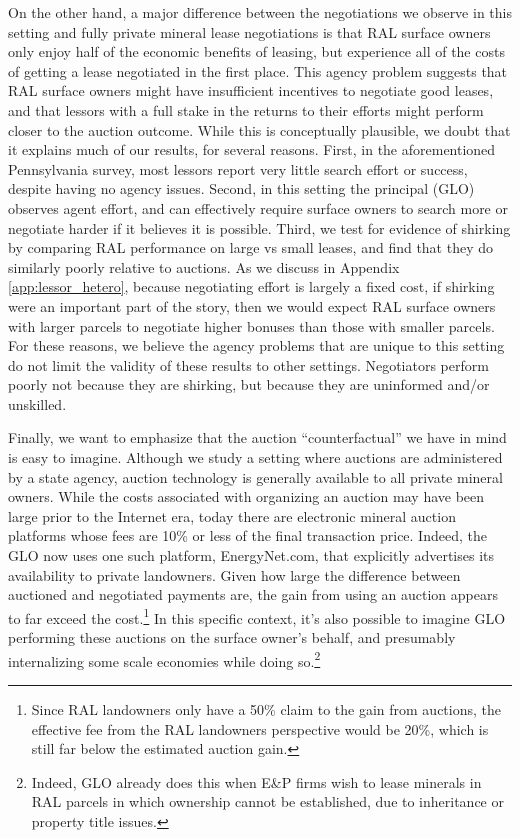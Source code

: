 \documentclass[12pt]{article}
\begin{document}
On the other hand, a major difference between the negotiations we observe in this setting and fully private mineral lease negotiations is that RAL surface owners only enjoy half of the economic benefits of leasing, but experience all of the costs of getting a lease negotiated in the first place. This agency problem suggests that RAL surface owners might have insufficient incentives to negotiate good leases, and that lessors with a full stake in the returns to their efforts might perform closer to the auction outcome. While this is conceptually plausible, we doubt that it explains much of our results, for several reasons. First, in the aforementioned Pennsylvania survey, most lessors report very little search effort or success, despite having no agency issues. Second, in this setting the principal (GLO) observes agent effort, and can effectively require surface owners to search more or negotiate harder if it believes it is possible. Third, we test for evidence of shirking by comparing RAL performance on large vs small leases, and find that they do similarly poorly relative to auctions. As we discuss in Appendix \ref{app:lessor_hetero}, because negotiating effort is largely a fixed cost, if shirking were an important part of the story, then we would expect RAL surface owners with larger parcels to negotiate higher bonuses than those with smaller parcels. For these reasons, we believe the agency problems that are unique to this setting do not limit the validity of these results to other settings. Negotiators perform poorly not because they are shirking, but because they are uninformed and/or unskilled. 

Finally, we want to emphasize that the auction ``counterfactual'' we have in mind is easy to imagine. Although we study a setting where auctions are administered by a state agency, auction technology is generally available to all private mineral owners. While the costs associated with organizing an auction may have been large prior to the Internet era, today there are electronic mineral auction platforms whose fees are 10\% or less of the final transaction price.  Indeed, the  GLO now uses one such platform, EnergyNet.com, that explicitly advertises its availability to private landowners.  Given how large the difference between auctioned and negotiated payments are, the gain from using an auction appears to far exceed the cost.\footnote{Since RAL landowners only have a 50\% claim to the gain from auctions, the effective fee from the RAL landowners perspective would be 20\%, which is still far below the estimated auction gain.} In this specific context, it's also possible to imagine GLO performing these auctions on the surface owner's behalf, and presumably internalizing some scale economies while doing so.\footnote{Indeed, GLO already does this when E\&P firms wish to lease minerals in RAL parcels in which ownership cannot be established, due to inheritance or property title issues.} 
\end{document}
